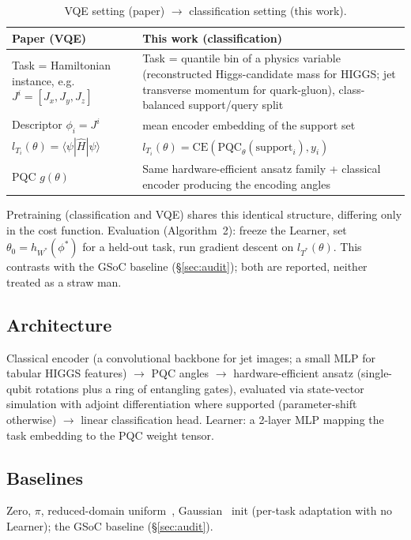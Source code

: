 \documentclass[11pt]{article}
\begin{document}
\begin{table}[ht]
\centering\small
\caption{VQE setting (paper) $\to$ classification setting (this work).}
\label{tab:method-map}
\begin{tabular}{p{}p{}}
\toprule
\textbf{Paper (VQE)} & \textbf{This work (classification)} \\
\midrule
Task = Hamiltonian instance, e.g.\ $J^i=[J_x,J_y,J_z]$ &
Task = quantile bin of a physics variable (reconstructed Higgs-candidate mass for HIGGS; jet transverse
momentum for quark-gluon), class-balanced support/query split \\
Descriptor $\phi_i=J^i$ & mean encoder embedding of the support set \\
$l_{T_i}(\theta)=\langle\psi|\hat H|\psi\rangle$ & $l_{T_i}(\theta)=\mathrm{CE}(\mathrm{PQC}_\theta(\text{support}_i), y_i)$ \\
PQC $g(\theta)$ & Same hardware-efficient ansatz family + classical encoder producing the encoding angles \\
\bottomrule
\end{tabular}
\end{table}

Pretraining (classification and VQE) shares this identical structure, differing only in the cost function.
Evaluation (Algorithm~2): freeze the Learner, set $\theta_0=h_{W^*}(\phi^*)$ for a held-out task, run
gradient descent on $l_{T^*}(\theta)$. This contrasts with the GSoC baseline (\S\ref{sec:audit}); both are
reported, neither treated as a straw man.

\subsection{Architecture}
Classical encoder (a convolutional backbone for jet images; a small MLP for tabular HIGGS features)
$\to$ PQC angles $\to$ hardware-efficient ansatz (single-qubit rotations plus a ring of entangling gates),
evaluated via state-vector simulation with adjoint differentiation where supported (parameter-shift
otherwise) $\to$ linear classification head. Learner: a 2-layer MLP mapping the task embedding to the PQC
weight tensor.

\subsection{Baselines}
Zero, $\pi$, reduced-domain uniform~\citep{wang2023trainability}, Gaussian~\citep{zhang2022escaping} init
(per-task adaptation with no Learner); the GSoC baseline (\S\ref{sec:audit}).
\end{document}
